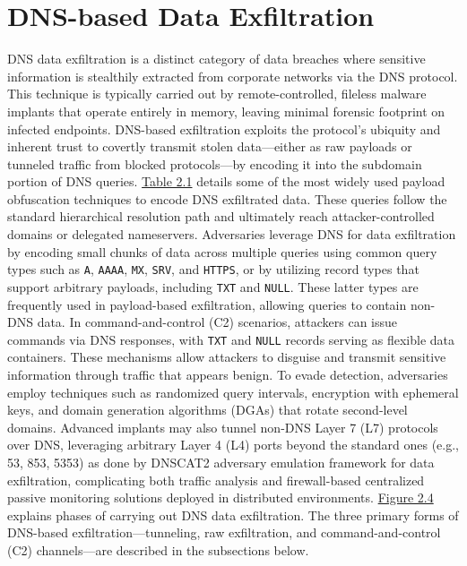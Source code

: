 \documentclass [11pt, proquest] {uwthesis}[2020/02/24]
\begin{document}
\section{DNS-based Data Exfiltration}
DNS data exfiltration is a distinct category of data breaches where sensitive information is stealthily extracted from corporate networks via the DNS protocol. This technique is typically carried out by remote-controlled, fileless malware implants that operate entirely in memory, leaving minimal forensic footprint on infected endpoints. DNS-based exfiltration exploits the protocol’s ubiquity and inherent trust to covertly transmit stolen data—either as raw payloads or tunneled traffic from blocked protocols—by encoding it into the subdomain portion of DNS queries. \hyperref[dns_payload_obfuscation]{Table 2.1} details some of the most widely used payload obfuscation techniques to encode DNS exfiltrated data. These queries follow the standard hierarchical resolution path and ultimately reach attacker-controlled domains or delegated nameservers. Adversaries leverage DNS for data exfiltration by encoding small chunks of data across multiple queries using common query types such as \texttt{A}, \texttt{AAAA}, \texttt{MX}, \texttt{SRV}, and \texttt{HTTPS}, or by utilizing record types that support arbitrary payloads, including \texttt{TXT} and \texttt{NULL}. These latter types are frequently used in payload-based exfiltration, allowing queries to contain non-DNS data. In command-and-control (C2) scenarios, attackers can issue commands via DNS responses, with \texttt{TXT} and \texttt{NULL} records serving as flexible data containers. These mechanisms allow attackers to disguise and transmit sensitive information through traffic that appears benign. To evade detection, adversaries employ techniques such as randomized query intervals, encryption with ephemeral keys, and domain generation algorithms (DGAs) that rotate second-level domains. Advanced implants may also tunnel non-DNS Layer 7 (L7) protocols over DNS, leveraging arbitrary Layer 4 (L4) ports beyond the standard ones (e.g., 53, 853, 5353) as done by DNSCAT2 adversary emulation framework for data exfiltration, complicating both traffic analysis and firewall-based centralized passive monitoring solutions deployed in distributed environments.
\hyperref[sec:dns c2 flow]{Figure 2.4} explains phases of carrying out DNS data exfiltration.
The three primary forms of DNS-based exfiltration—tunneling, raw exfiltration, and command-and-control (C2) channels—are described in the subsections below.
\end{document}
